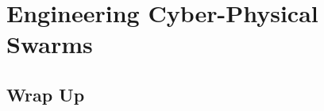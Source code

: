 \documentclass[12pt,a4paper,oneside]{book}
\begin{document}
\part{Engineering Cyber-Physical Swarms}
\begin{refsection}\end{refsection}
\begin{refsection}\end{refsection}
\begin{refsection}\end{refsection}
\begin{refsection}\end{refsection}
\begin{refsection}\end{refsection}
\begin{refsection}\end{refsection}

\chapter{Wrap Up}

\end{document}
